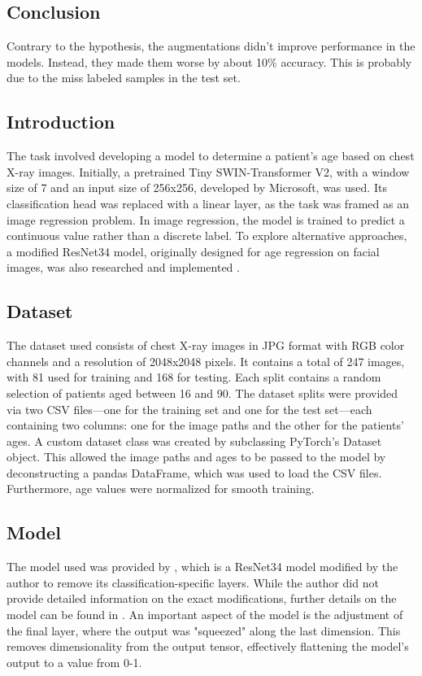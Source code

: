 \documentclass[10pt,twocolumn,letterpaper]{article}
\begin{document}
\subsection{Conclusion}
Contrary to the hypothesis, the augmentations didn't improve performance in the models. Instead, they made them worse by about 10\% accuracy. This is probably due to the miss labeled samples in the test set.
\newpage
\subsection{Introduction}
The task involved developing a model to determine a patient's age based on chest X-ray images. Initially, a pretrained Tiny SWIN-Transformer V2, with a window size of 7 and an input size of 256x256, developed by Microsoft, was used. Its classification head was replaced with a linear layer, as the task was framed as an image regression problem. In image regression, the model is trained to predict a continuous value rather than a discrete label. To explore alternative approaches, a modified ResNet34 model, originally designed for age regression on facial images, was also researched and implemented \cite{medium_age_prediction}.


\subsection{Dataset}
The dataset used \cite{DatasetForClass} consists of chest X-ray images in JPG format with RGB color channels and a resolution of 2048x2048 pixels. It contains a total of 247 images, with 81 used for training and 168 for testing. Each split contains a random selection of patients aged between 16 and 90. The dataset splits were provided via two CSV files—one for the training set and one for the test set—each containing two columns: one for the image paths and the other for the patients' ages. A custom dataset class was created by subclassing PyTorch's Dataset object. This allowed the image paths and ages to be passed to the model by deconstructing a pandas DataFrame, which was used to load the CSV files. Furthermore, age values were normalized for smooth training.
\subsection{Model}
The model used was provided by \cite{medium_age_prediction}, which is a ResNet34 model modified by the author to remove its classification-specific layers. While the author did not provide detailed information on the exact modifications, further details on the model can be found in \cite{medium_age_prediction}. An important aspect of the model is the adjustment of the final layer, where the output was "squeezed" along the last dimension. This removes dimensionality from the output tensor, effectively flattening the model’s output to a value from 0-1.
\end{document}
